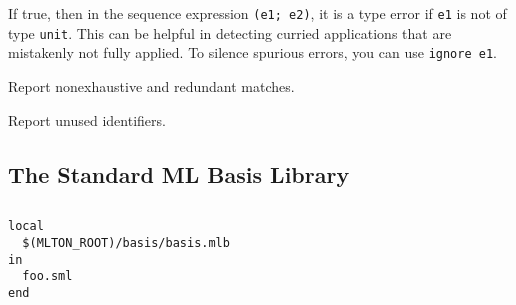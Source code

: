 \begin{description}
If true, then in the sequence expression {\tt (e1; e2)}, it is a type
error if {\tt e1} is not of type {\tt unit}.  This can be helpful in
detecting curried applications that are mistakenly not fully applied.
To silence spurious errors, you can use {\tt ignore e1}.

Report nonexhaustive and redundant matches.

Report unused identifiers.
\end{description}


%
\subsection{The Standard ML Basis Library}

%
\subsection{}

\begin{verbatim}
local
  $(MLTON_ROOT)/basis/basis.mlb
in
  foo.sml
end
\end{verbatim}
